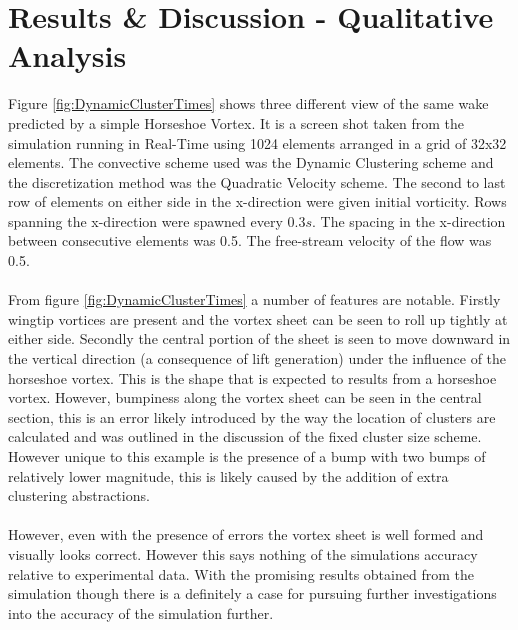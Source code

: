 \section{Results \& Discussion - Qualitative Analysis}

Figure \ref{fig:DynamicClusterTimes} shows three different view of the same wake predicted by a simple Horseshoe Vortex.  It is a screen shot taken from the simulation running in Real-Time using 1024 elements arranged in a grid of 32x32 elements. The convective scheme used was the Dynamic Clustering scheme and the discretization method was the Quadratic Velocity scheme. The second to last row of elements on either side in the x-direction were given initial vorticity. Rows spanning the x-direction were spawned every $0.3s$. The spacing in the x-direction between consecutive elements was 0.5. The free-stream velocity of the flow was 0.5. 
\\\\
From figure \ref{fig:DynamicClusterTimes} a number of features are notable. Firstly wingtip vortices are present and the vortex sheet can be seen to roll up tightly at either side. Secondly the central portion of the sheet is seen to move downward in the vertical direction (a consequence of lift generation) under the influence of the horseshoe vortex. This is the shape that is expected to results from a horseshoe vortex. However, bumpiness along the vortex sheet can be seen in the central section, this is an error likely introduced by the way the location of clusters are calculated and was outlined in the discussion of the fixed cluster size scheme. However unique to this example is the presence of a bump with two bumps of relatively lower magnitude, this is likely caused by the addition of extra clustering abstractions.
\\\\
However, even with the presence of errors the vortex sheet is well formed and visually looks correct. However this says nothing of the simulations accuracy relative to experimental data. With the promising results obtained from the simulation though there is a definitely a case for pursuing further investigations into the accuracy of the simulation further.

